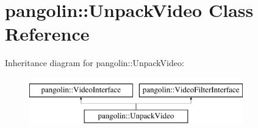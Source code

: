 \hypertarget{classpangolin_1_1_unpack_video}{}\section{pangolin\+:\+:Unpack\+Video Class Reference}
\label{classpangolin_1_1_unpack_video}
Inheritance diagram for pangolin\+:\+:Unpack\+Video\+:\begin{figure}[H]
\begin{center}
\leavevmode
\includegraphics[height=2.000000cm]{classpangolin_1_1_unpack_video}
\end{center}
\end{figure}
